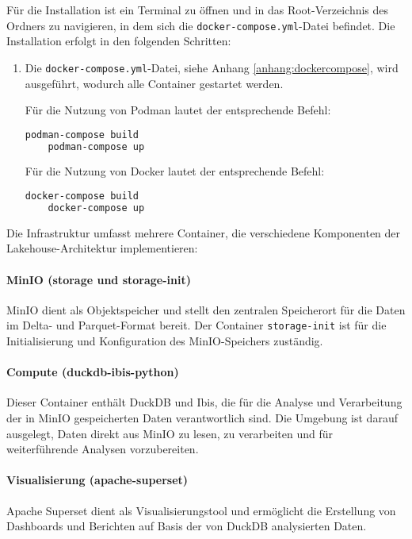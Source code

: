Für die Installation ist ein Terminal zu öffnen und in das Root-Verzeichnis des Ordners zu navigieren, in dem sich die \lstinline|docker-compose.yml|-Datei befindet. Die Installation erfolgt in den folgenden Schritten:

\begin{enumerate}
    \item Die \lstinline|docker-compose.yml|-Datei, siehe Anhang \ref{anhang:dockercompose}, wird ausgeführt, wodurch alle Container gestartet werden.
    
    Für die Nutzung von Podman lautet der entsprechende Befehl:

    \begin{lstlisting}[language=bash]
    podman-compose build 
    podman-compose up 
    \end{lstlisting}

    Für die Nutzung von Docker lautet der entsprechende Befehl:

    \begin{lstlisting}[language=bash]
    docker-compose build
    docker-compose up 
    \end{lstlisting}

\end{enumerate}

Die Infrastruktur umfasst mehrere Container, die verschiedene Komponenten der Lakehouse-Architektur implementieren:

\paragraph{MinIO (storage und storage-init)}  
MinIO dient als Objektspeicher und stellt den zentralen Speicherort für die Daten im Delta- und Parquet-Format bereit. Der Container \lstinline|storage-init| ist für die Initialisierung und Konfiguration des MinIO-Speichers zuständig.

\paragraph{Compute (duckdb-ibis-python)}  
Dieser Container enthält DuckDB und Ibis, die für die Analyse und Verarbeitung der in MinIO gespeicherten Daten verantwortlich sind. Die Umgebung ist darauf ausgelegt, Daten direkt aus MinIO zu lesen, zu verarbeiten und für weiterführende Analysen vorzubereiten.

\paragraph{Visualisierung (apache-superset)}  
Apache Superset dient als Visualisierungstool und ermöglicht die Erstellung von Dashboards und Berichten auf Basis der von DuckDB analysierten Daten.  

